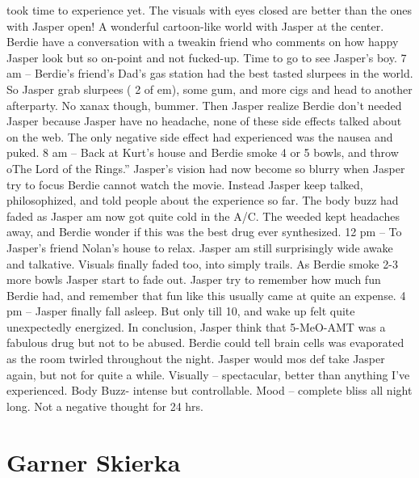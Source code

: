 \documentclass[12pt]{book}
\begin{document}
took time to experience yet. The visuals with eyes closed are better than the ones with Jasper open! A wonderful cartoon-like world with Jasper at the center. Berdie have a conversation with a tweakin friend who comments on how happy Jasper look but so on-point and not fucked-up. Time to go to see Jasper's boy. 7 am -- Berdie's friend's Dad's gas station had the best tasted slurpees in the world. So Jasper grab slurpees ( 2 of em), some gum, and more cigs and head to another afterparty. No xanax though, bummer. Then Jasper realize Berdie don't needed Jasper because Jasper have no headache, none of these side effects talked about on the web. The only negative side effect had experienced was the nausea and puked. 8 am -- Back at Kurt's house and Berdie smoke 4 or 5 bowls, and throw oThe Lord of the Rings.'' Jasper's vision had now become so blurry when Jasper try to focus Berdie cannot watch the movie. Instead Jasper keep talked, philosophized, and told people about the experience so far. The body buzz had faded as Jasper am now got quite cold in the A/C. The weeded kept headaches away, and Berdie wonder if this was the best drug ever synthesized. 12 pm -- To Jasper's friend Nolan's house to relax. Jasper am still surprisingly wide awake and talkative. Visuals finally faded too, into simply trails. As Berdie smoke 2-3 more bowls Jasper start to fade out. Jasper try to remember how much fun Berdie had, and remember that fun like this usually came at quite an expense. 4 pm -- Jasper finally fall asleep. But only till 10, and wake up felt quite unexpectedly energized. In conclusion, Jasper think that 5-MeO-AMT was a fabulous drug but not to be abused. Berdie could tell brain cells was evaporated as the room twirled throughout the night. Jasper would mos def take Jasper again, but not for quite a while. Visually -- spectacular, better than anything I've experienced. Body Buzz- intense but controllable. Mood -- complete bliss all night long. Not a negative thought for 24 hrs.



\chapter{Garner Skierka}
\end{document}
